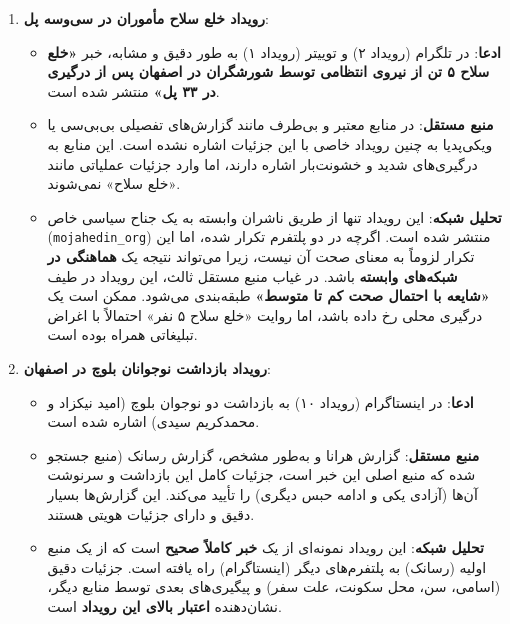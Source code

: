 \documentclass{article}
\begin{document}
\begin{enumerate}
		\item \textbf{رویداد خلع سلاح مأموران در سی‌وسه پل}:
		\begin{itemize}
			\item \textbf{ادعا}: در تلگرام (رویداد ۲) و توییتر (رویداد ۱) به طور دقیق و مشابه، خبر \textbf{«خلع سلاح ۵ تن از نیروی انتظامی توسط شورشگران در اصفهان پس از درگیری در ۳۳ پل»} منتشر شده است.
			\item \textbf{منبع مستقل}: در منابع معتبر و بی‌طرف مانند گزارش‌های تفصیلی بی‌بی‌سی \cite{bbc_casualties} یا ویکی‌پدیا \cite{wikipedia_uprising} به چنین رویداد خاصی با این جزئیات اشاره نشده است. این منابع به درگیری‌های شدید و خشونت‌بار اشاره دارند، اما وارد جزئیات عملیاتی مانند «خلع سلاح» نمی‌شوند.
			\item \textbf{تحلیل شبکه}: این رویداد تنها از طریق ناشران وابسته به یک جناح سیاسی خاص (\texttt{mojahedin\_org}) منتشر شده است. اگرچه در دو پلتفرم تکرار شده، اما این تکرار لزوماً به معنای صحت آن نیست، زیرا می‌تواند نتیجه یک \textbf{هماهنگی در شبکه‌های وابسته} باشد. در غیاب منبع مستقل ثالث، این رویداد در طیف \textbf{«شایعه با احتمال صحت کم تا متوسط»} طبقه‌بندی می‌شود. ممکن است یک درگیری محلی رخ داده باشد، اما روایت «خلع سلاح ۵ نفر» احتمالاً با اغراض تبلیغاتی همراه بوده است.
		\end{itemize}
		
		\item \textbf{رویداد بازداشت نوجوانان بلوچ در اصفهان}:
		\begin{itemize}
			\item \textbf{ادعا}: در اینستاگرام (رویداد ۱۰) به بازداشت دو نوجوان بلوچ (امید نیکزاد و محمدکریم سیدی) اشاره شده است.
			\item \textbf{منبع مستقل}: گزارش هرانا و به‌طور مشخص، گزارش رسانک (منبع جستجو شده  که منبع اصلی این خبر است، جزئیات کامل این بازداشت و سرنوشت آن‌ها (آزادی یکی و ادامه حبس دیگری) را تأیید می‌کند. این گزارش‌ها بسیار دقیق و دارای جزئیات هویتی هستند.
			\item \textbf{تحلیل شبکه}: این رویداد نمونه‌ای از یک \textbf{خبر کاملاً صحیح} است که از یک منبع اولیه (رسانک) به پلتفرم‌های دیگر (اینستاگرام) راه یافته است. جزئیات دقیق (اسامی، سن، محل سکونت، علت سفر) و پیگیری‌های بعدی توسط منابع دیگر، نشان‌دهنده \textbf{اعتبار بالای این رویداد} است.
		\end{itemize}
		

\end{enumerate}
\end{document}
